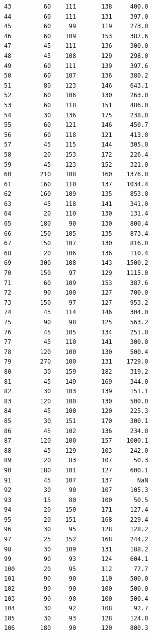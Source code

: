 \begin{code}
\begin{verbatim}
43         60    111       138     400.0
44         60    111       131     397.0
45         60     99       119     273.0
46         60    109       153     387.6
47         45    111       136     300.0
48         45    108       129     298.0
49         60    111       139     397.6
50         60    107       136     380.2
51         80    123       146     643.1
52         60    106       130     263.0
53         60    118       151     486.0
54         30    136       175     238.0
55         60    121       146     450.7
56         60    118       121     413.0
57         45    115       144     305.0
58         20    153       172     226.4
59         45    123       152     321.0
60        210    108       160    1376.0
61        160    110       137    1034.4
62        160    109       135     853.0
63         45    118       141     341.0
64         20    110       130     131.4
65        180     90       130     800.4
66        150    105       135     873.4
67        150    107       130     816.0
68         20    106       136     110.4
69        300    108       143    1500.2
70        150     97       129    1115.0
71         60    109       153     387.6
72         90    100       127     700.0
73        150     97       127     953.2
74         45    114       146     304.0
75         90     98       125     563.2
76         45    105       134     251.0
77         45    110       141     300.0
78        120    100       130     500.4
79        270    100       131    1729.0
80         30    159       182     319.2
81         45    149       169     344.0
82         30    103       139     151.1
83        120    100       130     500.0
84         45    100       120     225.3
85         30    151       170     300.1
86         45    102       136     234.0
87        120    100       157    1000.1
88         45    129       103     242.0
89         20     83       107      50.3
90        180    101       127     600.1
91         45    107       137       NaN
92         30     90       107     105.3
93         15     80       100      50.5
94         20    150       171     127.4
95         20    151       168     229.4
96         30     95       128     128.2
97         25    152       168     244.2
98         30    109       131     188.2
99         90     93       124     604.1
100        20     95       112      77.7
101        90     90       110     500.0
102        90     90       100     500.0
103        90     90       100     500.4
104        30     92       108      92.7
105        30     93       128     124.0
106       180     90       120     800.3

\end{verbatim}
\end{code}
